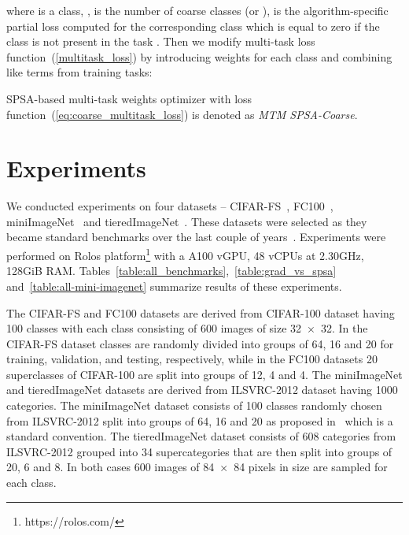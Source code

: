 \documentclass{article}
\begin{document}
where  is a class, ,  is the number of coarse classes (or ),  is the algorithm-specific partial loss computed for the corresponding class which is equal to zero if the class  is not present in the task . Then we modify multi-task loss function~(\ref{multitask_loss}) by introducing weights  for each class and combining like terms from  training tasks:

SPSA-based multi-task weights optimizer with loss function~(\ref{eq:coarse_multitask_loss}) is denoted as {\it MTM SPSA-Coarse}.

\section{Experiments}

We conducted experiments on four datasets -- CIFAR-FS~\cite{bertinetto2018metalearning}, FC100~\cite{NEURIPS2018_66808e32}, miniImageNet~\cite{vinyals2016matching} and tieredImageNet~\cite{ren2018metalearning}. These datasets were selected as they became standard benchmarks over the last couple of years~\cite{Dhillon2020A, tian2020rethinking}. Experiments were performed on Rolos platform\footnote[1]{https://rolos.com/} with a A100 vGPU, 48 vCPUs at 2.30GHz, 128GiB RAM. Tables~\ref{table:all_benchmarks},~\ref{table:grad_vs_spsa} and~\ref{table:all-mini-imagenet} summarize results of these experiments.

The CIFAR-FS and FC100 datasets are derived from CIFAR-100 dataset having 100 classes with each class consisting of 600 images of size 32~×~32. In the CIFAR-FS dataset classes are randomly divided into groups of 64, 16 and 20 for training, validation, and testing, respectively, while in the FC100 datasets 20 superclasses of CIFAR-100 are split into groups of 12, 4 and 4. The miniImageNet and tieredImageNet datasets are derived from ILSVRC-2012 dataset having 1000 categories. The miniImageNet dataset consists of 100 classes randomly chosen from ILSVRC-2012 split into groups of 64, 16 and 20 as proposed in~\cite{Ravi2017OptimizationAA} which is a standard convention. The tieredImageNet dataset consists of 608 categories from ILSVRC-2012 grouped into 34 supercategories that are then split into  groups of 20, 6 and 8. In both cases 600 images of 84~×~84 pixels in size are sampled for each class.
\end{document}
